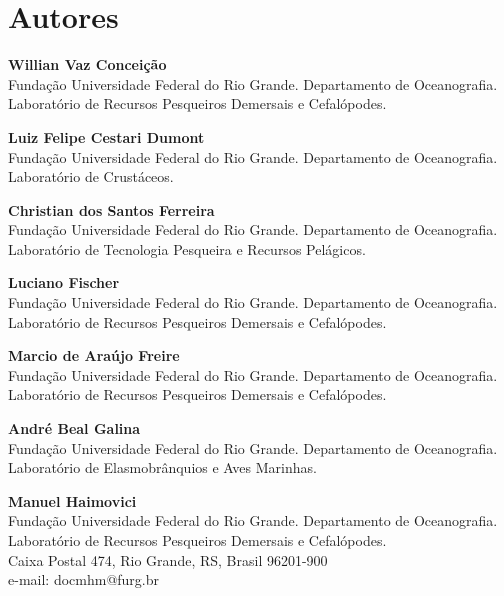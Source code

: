 \documentclass[a4paper,11pt,twoside,showtrims,onecolumn,openright,final]{memoir}
\begin{document}
\twocolumn
\chapter*{Autores}

\thispagestyle{empty}

\begin{scriptsize}
\begin{flushleft}

\textbf{Willian Vaz Conceição} \\
\vspace{1pt}
Fundação Universidade Federal do Rio Grande. Departamento de Oceanografia.
Laboratório de Recursos Pesqueiros Demersais e Cefalópodes.

\textbf{Luiz Felipe Cestari Dumont} \\
\vspace{1pt}
Fundação Universidade Federal do Rio Grande.
Departamento de Oceanografia.
Laboratório de Crustáceos.

\textbf{Christian dos Santos Ferreira} \\
\vspace{1pt}
Fundação Universidade Federal do Rio Grande.
Departamento de Oceanografia.
Laboratório de Tecnologia Pesqueira e Recursos Pelágicos.

\textbf{Luciano Fischer} \\
\vspace{1pt}
Fundação Universidade Federal do Rio Grande.
Departamento de Oceanografia.
Laboratório de Recursos Pesqueiros Demersais e Cefalópodes.

\textbf{Marcio de Araújo Freire} \\
\vspace{1pt}
Fundação Universidade Federal do Rio Grande.
Departamento de Oceanografia.
Laboratório de Recursos Pesqueiros Demersais e Cefalópodes.

\textbf{André Beal Galina} \\
\vspace{1pt}
Fundação Universidade Federal do Rio Grande.
Departamento de Oceanografia.
Laboratório de Elasmobrânquios e Aves Marinhas.

\textbf{Manuel Haimovici} \\
\vspace{1pt}
Fundação Universidade Federal do Rio Grande.
Departamento de Oceanografia.
Laboratório de Recursos Pesqueiros Demersais e Cefalópodes. \\
Caixa Postal 474, Rio Grande, RS, Brasil 96201-900 \\
e-mail: docmhm@furg.br


\end{flushleft}
\end{scriptsize}
\end{document}
